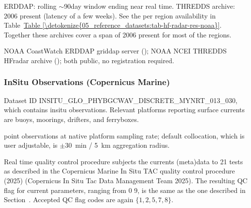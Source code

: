 \documentclass[a4paper,10pt,english]{sphinxmanual}
\begin{document}
\sphinxAtStartPar
{}

\sphinxAtStartPar
ERDDAP: rolling \(\sim\)90\sphinxhyphen{}day window ending near real time. THREDDS archive: 2006 \textendash{} present (latency of a few weeks). See the per region availability in Table \hyperref[\detokenize{05_reference_datasets:tab-hf-radar-res-noaa}]{Table \ref{\detokenize{05_reference_datasets:tab-hf-radar-res-noaa}}}. Together these archives cover a span of 2006 \textendash{} present for most of the regions.

\sphinxAtStartPar
{}

\sphinxAtStartPar
NOAA CoastWatch ERDDAP griddap server (); NOAA NCEI THREDDS HF\sphinxhyphen{}radar archive (); both public, no registration required.


\subsubsection{In\sphinxhyphen{}Situ Observations (Copernicus Marine)}
\label{\detokenize{05_reference_datasets:in-situ-observations-copernicus-marine}}
\sphinxAtStartPar
{}

\sphinxAtStartPar
Dataset ID INSITU\_GLO\_PHYBGCWAV\_DISCRETE\_MYNRT\_013\_030, which contains in\sphinxhyphen{}situ observations. Relevant platforms reporting surface currents are buoys, moorings, drifters, and ferryboxes.

\sphinxAtStartPar
{}

\sphinxAtStartPar
point observations at native platform sampling rate; default collocation, which is user adjustable, is \(\pm\)30 min / 5 km aggregation radius.

\sphinxAtStartPar
{}

\sphinxAtStartPar
Real time quality control procedure subjects the currents (meta)data to 21 tests as described in the Copernicus Marine In Situ TAC quality control procedure (2025) (Copernicus In Situ Tac Data Management Team 2025). The resulting QC flag for current parameters, ranging from 0 \textendash{} 9, is the same as the one described in Section {\hyperref[\detokenize{05_reference_datasets:subpar-cmems-insitu-waves}]{}}. Accepted QC flag codes are again \(\{1,2,5,7,8\}\).
\end{document}
